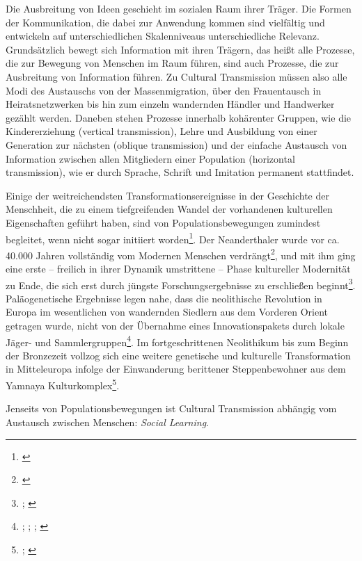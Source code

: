 \documentclass[openany,twoside,twocolumn]{book}
\let\rmarkdownfootnote\footnote%
\def\footnote{\protect\rmarkdownfootnote}
\begin{document}
Die Ausbreitung von Ideen geschieht im sozialen Raum ihrer Träger. Die
Formen der Kommunikation, die dabei zur Anwendung kommen sind vielfältig
und entwickeln auf unterschiedlichen Skalenniveaus unterschiedliche
Relevanz. Grundsätzlich bewegt sich Information mit ihren Trägern, das
heißt alle Prozesse, die zur Bewegung von Menschen im Raum führen, sind
auch Prozesse, die zur Ausbreitung von Information führen. Zu Cultural
Transmission müssen also alle Modi des Austauschs von der
Massenmigration, über den Frauentausch in Heiratsnetzwerken bis hin zum
einzeln wandernden Händler und Handwerker gezählt werden. Daneben stehen
Prozesse innerhalb kohärenter Gruppen, wie die Kindererziehung (vertical
transmission), Lehre und Ausbildung von einer Generation zur nächsten
(oblique transmission) und der einfache Austausch von Information
zwischen allen Mitgliedern einer Population (horizontal transmission),
wie er durch Sprache, Schrift und Imitation permanent stattfindet.

Einige der weitreichendsten Transformationsereignisse in der Geschichte
der Menschheit, die zu einem tiefgreifenden Wandel der vorhandenen
kulturellen Eigenschaften geführt haben, sind von Populationsbewegungen
zumindest begleitet, wenn nicht sogar initiiert worden\footnote{\textcite{boyd_voting_2009}}.
Der Neanderthaler wurde vor ca. 40.000 Jahren vollständig vom Modernen
Menschen verdrängt\footnote{\textcite{skoglund_origins_2012}}, und mit
ihm ging eine erste -- freilich in ihrer Dynamik umstrittene -- Phase
kultureller Modernität zu Ende, die sich erst durch jüngste
Forschungsergebnisse zu erschließen beginnt\footnote{\textcite{hoffmann_symbolic_2018};
  \textcite{tuniz_did_2012}}. Paläogenetische Ergebnisse legen nahe,
dass die neolithische Revolution in Europa im wesentlichen von
wandernden Siedlern aus dem Vorderen Orient getragen wurde, nicht von
der Übernahme eines Innovationspakets durch lokale Jäger- und
Sammlergruppen\footnote{\textcite{aoki_travelling_1996};
  \textcite{bar-yosef_nature_1998}; \textcite{patterson_modelling_2010};
  \textcite{skoglund_origins_2012}}. Im fortgeschrittenen Neolithikum
bis zum Beginn der Bronzezeit vollzog sich eine weitere genetische und
kulturelle Transformation in Mitteleuropa infolge der Einwanderung
berittener Steppenbewohner aus dem Yamnaya Kulturkomplex\footnote{\textcite{allentoft_population_2015};
  \textcite{goldberg_ancient_2017}}.

Jenseits von Populationsbewegungen ist Cultural Transmission abhängig
vom Austausch zwischen Menschen: \emph{Social Learning}.
\end{document}
